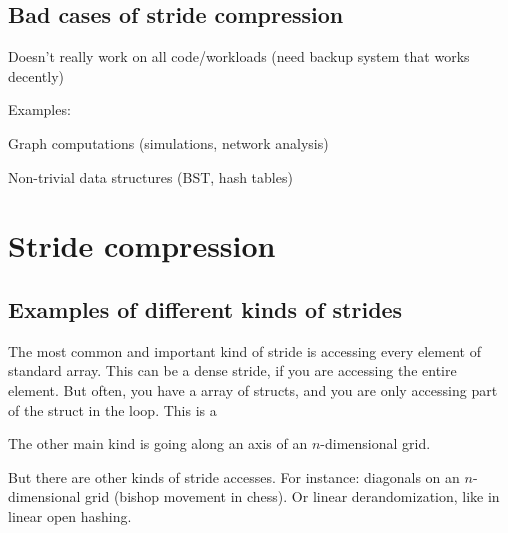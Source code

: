\documentclass[12pt,twoside]{reedthesis}
\begin{document}
		\subsection{Bad cases of stride compression}

		Doesn’t really work on all code/workloads (need backup system that works decently)

		Examples:

		Graph computations (simulations, network analysis)

		Non-trivial data structures (BST, hash tables)






	\section{Stride compression}

		\subsection{Examples of different kinds of strides}
		The most common and important kind of stride is accessing every element of standard array. This can be a dense stride, if you are accessing the entire element. But often, you have a array of structs, and you are only accessing part of the struct in the loop. This is a $ $

		The other main kind is going along an axis of an $n$-dimensional grid.

		But there are other kinds of stride accesses. For instance: diagonals on an $n$-dimensional grid (bishop movement in chess). Or linear derandomization, like in linear open hashing.
\end{document}

